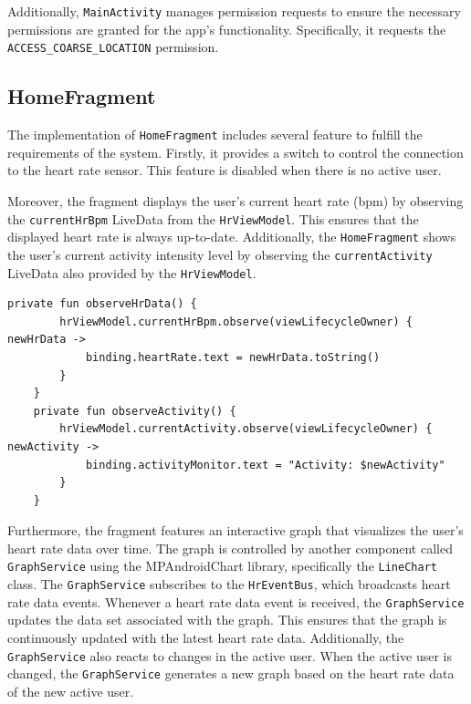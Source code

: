 Additionally, \texttt{MainActivity} manages permission requests to ensure the necessary permissions are granted for the app's functionality. Specifically, it requests the \texttt{ACCESS\_COARSE\_LOCATION} permission.

\subsection{HomeFragment}
The implementation of \texttt{HomeFragment} includes several feature to fulfill the requirements of the system. 
Firstly, it provides a switch to control the connection to the heart rate sensor. This feature is disabled when there is no active user.

Moreover, the fragment displays the user's current heart rate (bpm) by observing the \texttt{currentHrBpm} LiveData from the \texttt{HrViewModel}. This ensures that the displayed heart rate is always up-to-date.
Additionally, the \texttt{HomeFragment} shows the user's current activity intensity level by observing the \texttt{currentActivity} LiveData also provided by the \texttt{HrViewModel}. 
\begin{lstlisting}[caption={Observers for currentActivity and currentHrBpm (Kotlin - HomeFragment)}]
    private fun observeHrData() {
        hrViewModel.currentHrBpm.observe(viewLifecycleOwner) { newHrData ->
            binding.heartRate.text = newHrData.toString()
        }
    }
    private fun observeActivity() {
        hrViewModel.currentActivity.observe(viewLifecycleOwner) { newActivity ->
            binding.activityMonitor.text = "Activity: $newActivity"
        }
    }
\end{lstlisting}

Furthermore, the fragment features an interactive graph that visualizes the user's heart rate data over time. 
The graph is controlled by another component called \texttt{GraphService} using the MPAndroidChart library, specifically the \texttt{LineChart} class.
The \texttt{GraphService} subscribes to the \texttt{HrEventBus}, which broadcasts heart rate data events. 
Whenever a heart rate data event is received, the \texttt{GraphService} updates the data set associated with the graph. 
This ensures that the graph is continuously updated with the latest heart rate data.
Additionally, the \texttt{GraphService} also reacts to changes in the active user. 
When the active user is changed, the \texttt{GraphService} generates a new graph based on the heart rate data of the new active user. 

